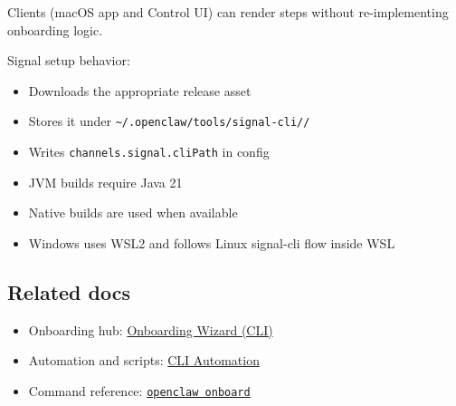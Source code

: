 Clients (macOS app and Control UI) can render steps without re-implementing onboarding logic.

Signal setup behavior:

\begin{itemize}
  \item Downloads the appropriate release asset
  \item Stores it under \texttt{\textasciitilde{}/.openclaw/tools/signal-cli//}
  \item Writes \texttt{channels.signal.cliPath} in config
  \item JVM builds require Java 21
  \item Native builds are used when available
  \item Windows uses WSL2 and follows Linux signal-cli flow inside WSL
\end{itemize}


\subsection{Related docs}


\begin{itemize}
  \item Onboarding hub: \href{/start/wizard}{Onboarding Wizard (CLI)}
  \item Automation and scripts: \href{/start/wizard-cli-automation}{CLI Automation}
  \item Command reference: \href{/cli/onboard}{\texttt{openclaw onboard}}
\end{itemize}



\clearpage

